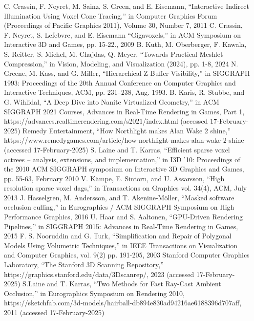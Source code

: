 \documentclass[conference]{IEEEtran}
\begin{document}
\begin{thebibliography}{00}
 C. Crassin, F. Neyret, M. Sainz, S. Green, and E. Eisemann, ``Interactive Indirect Illumination Using Voxel Cone Tracing,'' in Computer Graphics Forum (Proceedings of Pacific Graphics 2011), Volume 30, Number 7, 2011
 C. Crassin, F. Neyret, S. Lefebvre, and E. Eisemann ``Gigavoxels,'' in ACM Symposium on Interactive 3D and Games, pp. 15-22., 2009
 B. Kuth, M. Oberberger, F. Kawala, S. Reitter, S. Michel, M. Chajdas, Q. Meyer, ``Towards Practical Meshlet Compression,'' in Vision, Modeling, and Visualization (2024), pp. 1-8, 2024
 N. Greene, M. Kass, and G. Miller, ``Hierarchical Z-Buffer Visibility,'' in SIGGRAPH 1993: Proceedings of the 20th Annual Conference on Computer Graphics and Interactive Techniques, ACM, pp. 231–238, Aug. 1993.
 B. Karis, R. Stubbe, and G. Wihlidal, ``A Deep Dive into Nanite Virtualized Geometry,'' in ACM SIGGRAPH 2021 Courses, Advances in Real-Time Rendering in Games, Part 1, https://advances.realtimerendering.com/s2021/index.html (accessed 17-February-2025)
 Remedy Entertainment, ``How Northlight makes Alan Wake 2 shine,'' https://www.remedygames.com/article/how-northlight-makes-alan-wake-2-shine (accessed 17-February-2025)
 S. Laine and T. Karras, ``Efficient sparse voxel octrees – analysis, extensions, and implementation,'' in I3D '10: Proceedings of the 2010 ACM SIGGRAPH symposium on Interactive 3D Graphics and Games, pp. 55-63, February 2010
 V. Kämpe, E. Sintorn, and U. Assarsson, ``High resolution sparse voxel dags,'' in Transactions on Graphics vol. 34(4), ACM, July 2013
 J. Hasselgren, M. Andersson, and T. Akenine-Möller, ``Masked software occlusion culling,'' in Eurographics / ACM SIGGRAPH Symposium on High Performance Graphics, 2016
 U. Haar and S. Aaltonen, ``GPU-Driven Rendering Pipelines,'' in SIGGRAPH 2015: Advances in Real-Time Rendering in Games, 2015
 F. S. Nooruddin and G. Turk, ``Simplification and Repair of Polygonal Models Using Volumetric Techniques,'' in IEEE Transactions on Visualization and Computer Graphics, vol. 9(2) pp. 191-205, 2003
 Stanford Computer Graphics Laboratory, ``The Stanford 3D Scanning Repository,'' https://graphics.stanford.edu/data/3Dscanrep/, 2023 (accessed 17-February-2025)
 S.Laine and T. Karras, ``Two Methods for Fast Ray-Cast Ambient Occlusion,'' in Eurographics Symposium on Rendering 2010,  https://sketchfab.com/3d-models/hairball-db894e830ad94216ae6188396d707aff, 2011 (accessed 17-February-2025)
\end{thebibliography}
\vspace{12pt}
\end{document}

